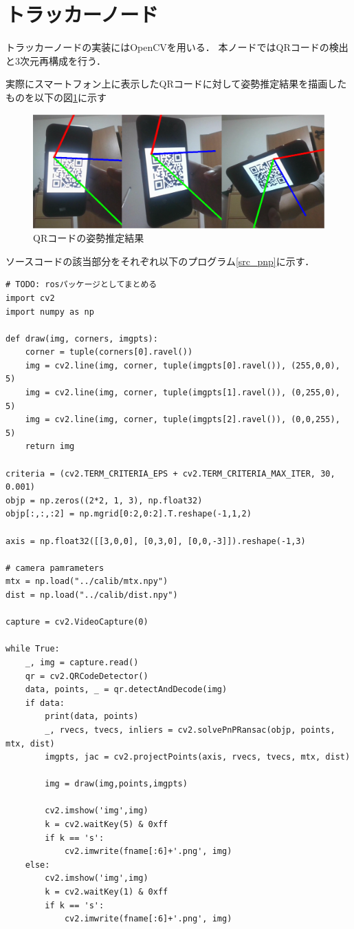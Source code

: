 \section{トラッカーノード}
\label{implement_tracker}
トラッカーノードの実装にはOpenCVを用いる．
本ノードではQRコードの検出と3次元再構成を行う．

実際にスマートフォン上に表示したQRコードに対して姿勢推定結果を描画したものを以下の図\ref{pnp_qr_img}に示す

\begin{figure}[htbp]
  \begin{center}
    \includegraphics[clip,width=15.0cm]{img/pnp_qr.png}
    \caption{QRコードの姿勢推定結果}
    \label{pnp_qr_img}
  \end{center}
\end{figure}

ソースコードの該当部分をそれぞれ以下のプログラム\ref{src_pnp}に示す．

\begin{lstlisting}[caption=pnp\_qr.py,label=src_pnp]
# TODO: rosパッケージとしてまとめる
import cv2
import numpy as np

def draw(img, corners, imgpts):
    corner = tuple(corners[0].ravel())
    img = cv2.line(img, corner, tuple(imgpts[0].ravel()), (255,0,0), 5)
    img = cv2.line(img, corner, tuple(imgpts[1].ravel()), (0,255,0), 5)
    img = cv2.line(img, corner, tuple(imgpts[2].ravel()), (0,0,255), 5)
    return img

criteria = (cv2.TERM_CRITERIA_EPS + cv2.TERM_CRITERIA_MAX_ITER, 30, 0.001)
objp = np.zeros((2*2, 1, 3), np.float32)
objp[:,:,:2] = np.mgrid[0:2,0:2].T.reshape(-1,1,2)

axis = np.float32([[3,0,0], [0,3,0], [0,0,-3]]).reshape(-1,3)

# camera pamrameters
mtx = np.load("../calib/mtx.npy")
dist = np.load("../calib/dist.npy")

capture = cv2.VideoCapture(0)

while True:
    _, img = capture.read()
    qr = cv2.QRCodeDetector()
    data, points, _ = qr.detectAndDecode(img)
    if data:
        print(data, points)
        _, rvecs, tvecs, inliers = cv2.solvePnPRansac(objp, points, mtx, dist)
        imgpts, jac = cv2.projectPoints(axis, rvecs, tvecs, mtx, dist)

        img = draw(img,points,imgpts)

        cv2.imshow('img',img)
        k = cv2.waitKey(5) & 0xff
        if k == 's':
            cv2.imwrite(fname[:6]+'.png', img)
    else:
        cv2.imshow('img',img)
        k = cv2.waitKey(1) & 0xff
        if k == 's':
            cv2.imwrite(fname[:6]+'.png', img)
\end{lstlisting}
